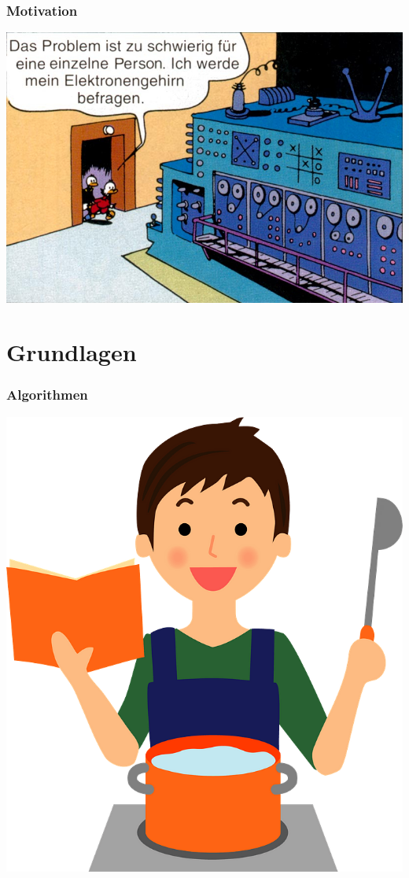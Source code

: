 \documentclass[aspectratio=169,xcolor=dvipsnames]{beamer}
\begin{document}
\begin{frame}
\frametitle{Motivation}
\begin{center}
\includegraphics[height=0.75\paperheight,keepaspectratio]{images/elektronengehirn} 
\end{center}
\end{frame}

\section{Grundlagen}

\begin{frame}
\frametitle{\glqq Algorithmen\grqq}
\begin{center}
\includegraphics[height=0.75\paperheight,keepaspectratio]{images/man-cooking-clipart} 
\end{center}
\end{frame}
\end{document}
